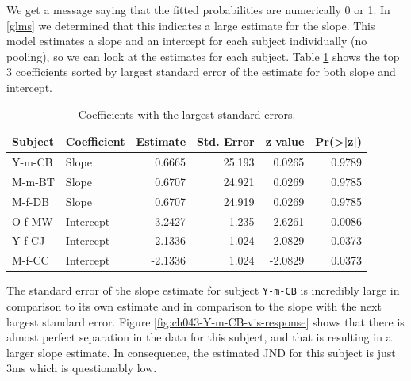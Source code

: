 \documentclass[11pt, oneside, openany]{scrbook}
\newenvironment{Shaded}{\begin{snugshade}}{\end{snugshade}}
\newcommand{\DataTypeTok}[1]{\textcolor[rgb]{0.13,0.29,0.53}{#1}}
\newcommand{\DecValTok}[1]{\textcolor[rgb]{0.00,0.00,0.81}{#1}}
\newcommand{\KeywordTok}[1]{\textcolor[rgb]{0.13,0.29,0.53}{\textbf{#1}}}
\newcommand{\NormalTok}[1]{#1}
\newcommand{\OperatorTok}[1]{\textcolor[rgb]{0.81,0.36,0.00}{\textbf{#1}}}
\newcommand{\StringTok}[1]{\textcolor[rgb]{0.31,0.60,0.02}{#1}}
\begin{document}
\begin{Shaded}
\end{Shaded}


We get a message saying that the fitted probabilities are numerically 0 or 1. In \ref{glms} we determined that this indicates a large estimate for the slope. This model estimates a slope and an intercept for each subject individually (no pooling), so we can look at the estimates for each subject. Table \ref{tab:ch043-Intensive-Oyster} shows the top 3 coefficients sorted by largest standard error of the estimate for both slope and intercept.

\begin{table}[!h]

\caption{\label{tab:ch043-Intensive-Oyster}Coefficients with the largest standard errors.}
\centering
\begin{tabular}[t]{llrrrr}
\toprule
Subject & Coefficient & Estimate & Std. Error & z value & Pr(>|z|)\\
\midrule
Y-m-CB & Slope & 0.6665 & 25.193 & 0.0265 & 0.9789\\
M-m-BT & Slope & 0.6707 & 24.921 & 0.0269 & 0.9785\\
M-f-DB & Slope & 0.6707 & 24.919 & 0.0269 & 0.9785\\
O-f-MW & Intercept & -3.2427 & 1.235 & -2.6261 & 0.0086\\
Y-f-CJ & Intercept & -2.1336 & 1.024 & -2.0829 & 0.0373\\
\addlinespace
M-f-CC & Intercept & -2.1336 & 1.024 & -2.0829 & 0.0373\\
\bottomrule
\end{tabular}
\end{table}

The standard error of the slope estimate for subject \texttt{Y-m-CB} is incredibly large in comparison to its own estimate and in comparison to the slope with the next largest standard error. Figure \ref{fig:ch043-Y-m-CB-vis-response} shows that there is almost perfect separation in the data for this subject, and that is resulting in a larger slope estimate. In consequence, the estimated JND for this subject is just 3ms which is questionably low.
\end{document}
